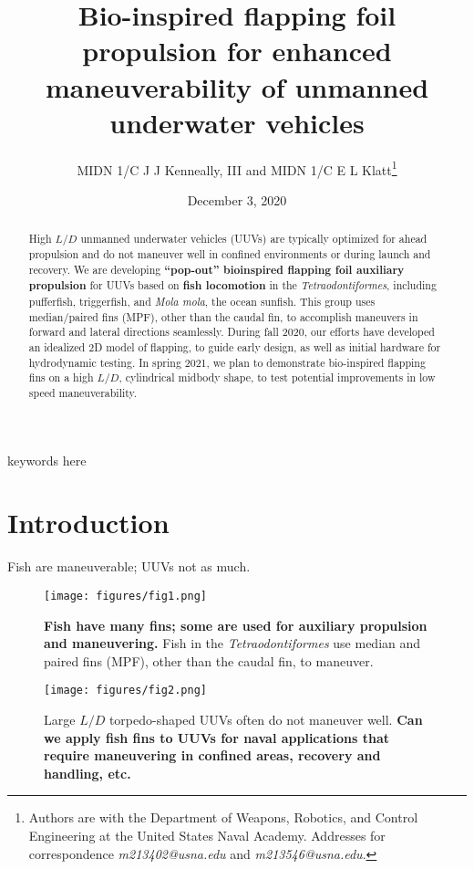 \documentclass[twocolumn,10pt]{IEEEtran}
\title{Bio-inspired flapping foil propulsion for enhanced maneuverability of unmanned underwater vehicles}
\author{MIDN 1/C J J Kenneally, III and MIDN 1/C E L  Klatt\thanks{Authors are with the Department of Weapons, Robotics, and Control Engineering at the United States Naval Academy. Addresses for correspondence \emph{m213402@usna.edu} and \emph{m213546@usna.edu}.}}
\date{December 3, 2020}
\begin{document}
\maketitle
\begin{abstract}
High $L/D$ unmanned underwater vehicles (UUVs) are typically optimized for ahead propulsion and do not maneuver well in confined environments or during launch and recovery.  We are developing \textbf{``pop-out'' bioinspired flapping foil auxiliary propulsion} for UUVs based on \textbf{fish locomotion} in the \emph{Tetraodontiformes}, including pufferfish, triggerfish, and \emph{Mola mola}, the ocean sunfish.  This group uses median/paired fins (MPF), other than the caudal fin, to accomplish maneuvers in forward and lateral directions seamlessly.  During fall 2020, our efforts have developed an idealized 2D model of flapping, to guide early design, as well as initial hardware for hydrodynamic testing. In spring 2021, we plan to demonstrate bio-inspired flapping fins on a high $L/D$, cylindrical midbody shape, to test potential improvements in low speed maneuverability.
\end{abstract}

\begin{IEEEkeywords}
keywords here
\end{IEEEkeywords}


\section{Introduction}
Fish are maneuverable; UUVs not as much. 
\begin{figure}
\begin{center}
\texttt{[image: figures/fig1.png]}
\end{center}
\caption{\textbf{Fish have many fins; some are used for auxiliary propulsion and maneuvering.}  Fish in the \emph{Tetraodontiformes} use median and paired fins (MPF), other than the caudal fin, to maneuver.}
\end{figure}
\begin{figure}
\begin{center}
\texttt{[image: figures/fig2.png]}
\end{center}
\caption{Large $L/D$ torpedo-shaped UUVs often do not maneuver well. \textbf{Can we apply fish fins to UUVs for naval applications that require maneuvering in confined areas, recovery and handling, etc.}}
\end{figure}
\end{document}
